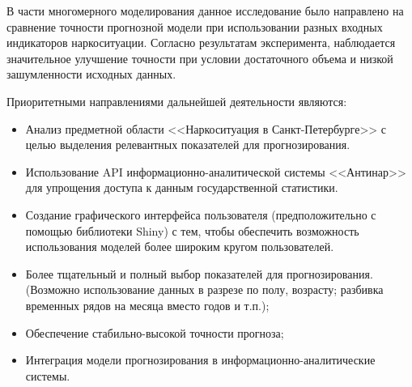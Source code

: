 В части многомерного моделирования данное исследование было направлено на
сравнение точности прогнозной модели при использовании разных входных
индикаторов наркоситуации.  Согласно результатам эксперимента, наблюдается
значительное улучшение точности при условии достаточного объема и низкой
зашумленности исходных данных. 

Приоритетными направлениями дальнейшей деятельности являются:
\begin{itemize}
	\item Анализ предметной области <<Наркоситуация в Санкт-Петербурге>> с целью выделения релевантных показателей для прогнозирования.
	\item Использование API информационно-аналитической системы <<Антинар>> для упрощения доступа к данным государственной статистики.
	\item Создание графического интерфейса пользователя (предположительно с помощью библиотеки Shiny) с тем, чтобы обеспечить возможность использования моделей более широким кругом пользователей.
    \item Более тщательный и полный выбор показателей для прогнозирования. 
        (Возможно использование данных в разрезе по полу, возрасту; разбивка 
        временных рядов на месяца вместо годов и т.п.);
    \item Обеспечение стабильно-высокой точности прогноза;
    \item Интеграция модели прогнозирования в информационно-аналитические
        системы.
\end{itemize}
	 
